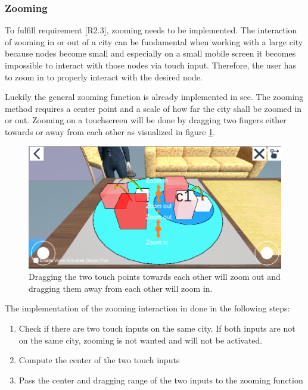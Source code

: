 \subsubsection{Zooming}
To fulfill requirement [R2.3], zooming needs to be implemented.
The interaction of zooming in or out of a \gls{city} can be fundamental when working with a large \gls{city} because \glspl{node} become small and especially on a small mobile screen it becomes impossible to interact with those \glspl{node} via touch input. 
Therefore, the user has to zoom in to properly interact with the desired \gls{node}.

Luckily the general zooming function is already implemented in \gls{see}.
The zooming method requires a center point and a scale of how far the \gls{city} shall be zoomed in or out.
Zooming on a touchscreen will be done by dragging two fingers either towards or away from each other as visualized in figure \ref{fig:zooming}.

\begin{figure}[htb]
    \centering
    \includegraphics[width=1\textwidth]{Implementation/img/zoom.png}
    \caption{Dragging the two touch points towards each other will zoom out and dragging them away from each other will zoom in.}\label{fig:zooming}
\end{figure}

The implementation of the zooming interaction in done in the following steps: 
\begin{enumerate}
    \item Check if there are two touch inputs on the same \gls{city}. If both inputs are not on the same city, zooming is not wanted and will not be activated.
    \item Compute the center of the two touch inputs
    \item Pass the center and dragging range of the two inputs to the zooming function
\end{enumerate}

